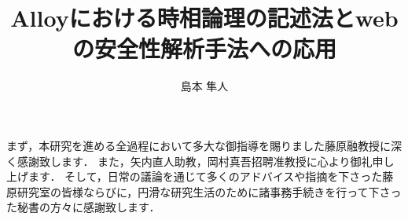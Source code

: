 \documentclass[12pt,a4paper]{jbook}
\title{Alloyにおける時相論理の記述法とwebの安全性解析手法への応用}
\author{島本 隼人}
\begin{document}
\coverpage
\tableofcontents
\listoffigures
\listoftables
\body

 \clearpage
 \clearpage
 \clearpage
 \clearpage
 \clearpage
 \clearpage
 \clearpage


\acknowledgement
まず，本研究を進める全過程において多大な御指導を賜りました藤原融教授に深く感謝致します．
また，矢内直人助教，岡村真吾招聘准教授に心より御礼申し上げます．
そして，日常の議論を通じて多くのアドバイスや指摘を下さった藤原研究室の皆様ならびに，円滑な研究生活のために諸事務手続きを行って下さった秘書の方々に感謝致します．





\end{document}
